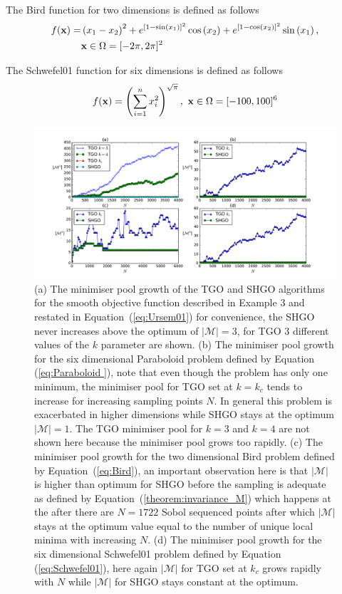 The Bird function for two dimensions is defined as follows \cite{Gavana2016}
\begin{align} \label{eq:Bird} \nonumber
f(\bold{x}) =& \left(x_1 - x_2\right)^{2} + e^{\left[1 -
         \sin\left(x_1\right) \right]^{2}} \cos\left(x_2\right) + e^{\left[1 -
          \cos\left(x_2\right)\right]^{2}} \sin\left(x_1\right), \\ 
          &\bold{x} \in \Omega = [-2\pi, 2\pi]^2 
\end{align}


The Schwefel01 function for six dimensions is defined as follows \cite{Gavana2016}
\begin{equation} \label{eq:Schwefel01}
f(\bold{x})= \left(\sum_{i=1}^n x_i^2 \right)^{\sqrt{\pi}} , ~ \bold{x} \in \Omega = [-100, 100]^6
\end{equation}

\begin{figure} %
\centerline{\includegraphics[scale=0.45]{./Fig11.pdf}}
{\caption{(a) The minimiser pool growth of the TGO and SHGO algorithms for the smooth objective function described in Example 3 and restated in Equation~(\ref{eq:Ursem01}) for convenience, the SHGO never increases above the optimum of $|\mathcal{M}| = 3$, for TGO 3 different values of the $k$ parameter are shown. (b) The minimiser pool growth for the six dimensional Paraboloid problem defined by Equation (\ref{eq:Paraboloid }), note that even though the problem has only one minimum, the minimiser pool for TGO set at $k = k_c$ tends to increase for increasing sampling points $N$. In general this problem is exacerbated in higher dimensions while SHGO stays at the optimum $|\mathcal{M}| = 1$. The TGO minimiser pool for $k = 3$ and $k = 4$ are not shown here because the minimiser pool grows too rapidly. (c) The minimiser pool growth for the two dimensional Bird problem defined by Equation~(\ref{eq:Bird}), an important observation here is that $|\mathcal{M}|$ is higher than optimum for SHGO before the sampling is adequate as defined by Equation~(\ref{theorem:invariance_M}) which happens at the after there are $N = 1722$ Sobol sequenced points after which $|\mathcal{M}|$ stays at the optimum value equal to the number of unique local minima with increasing $N$. (d) The minimiser pool growth for the six dimensional Schwefel01 problem defined by Equation (\ref{eq:Schwefel01}), here again $|\mathcal{M}|$ for TGO set at $k_c$ grows rapidly with $N$ while $|\mathcal{M}|$ for SHGO stays constant at the optimum.} \label{fig:resmin}} 

\end{figure}

